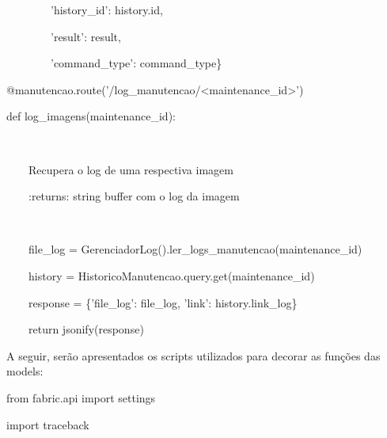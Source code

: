 {\ttfamily\color[rgb]{0.10980392,0.10980392,0.10980392}
    \ \ \ \ \ \ \ \ {}'history\_id': history.id,}

{\ttfamily\color[rgb]{0.10980392,0.10980392,0.10980392}
    \ \ \ \ \ \ \ \ {}'result': result,}

{\ttfamily\color[rgb]{0.10980392,0.10980392,0.10980392}
    \ \ \ \ \ \ \ \ {}'command\_type': command\_type\}}


    \bigskip


    \bigskip

{\ttfamily\color[rgb]{0.10980392,0.10980392,0.10980392}
    @manutencao.route('/log\_manutencao/{\textless}maintenance\_id{\textgreater}')}

{\ttfamily\color[rgb]{0.10980392,0.10980392,0.10980392}
    def log\_imagens(maintenance\_id):}

{\ttfamily\color[rgb]{0.10980392,0.10980392,0.10980392}
    \ \ \ \ {\textquotedbl}{\textquotedbl}{\textquotedbl}}

{\ttfamily\color[rgb]{0.10980392,0.10980392,0.10980392}
    \ \ \ \ Recupera o log de uma respectiva imagem}


    \bigskip

{\ttfamily\color[rgb]{0.10980392,0.10980392,0.10980392}
    \ \ \ \ :returns: string buffer com o log da imagem}

{\ttfamily\color[rgb]{0.10980392,0.10980392,0.10980392}
    \ \ \ \ {\textquotedbl}{\textquotedbl}{\textquotedbl}}

{\ttfamily\color[rgb]{0.10980392,0.10980392,0.10980392}
    \ \ \ \ file\_log = GerenciadorLog().ler\_logs\_manutencao(maintenance\_id)}

{\ttfamily\color[rgb]{0.10980392,0.10980392,0.10980392}
    \ \ \ \ history = HistoricoManutencao.query.get(maintenance\_id)}


    \bigskip

{\ttfamily\color[rgb]{0.10980392,0.10980392,0.10980392}
    \ \ \ \ response = \{'file\_log': file\_log, 'link': history.link\_log\}}

{\ttfamily\color[rgb]{0.10980392,0.10980392,0.10980392}
    \ \ \ \ return jsonify(response)}


    \bigskip

{\color{black}
    A seguir, ser\~ao apresentados os scripts utilizados para decorar as fun\c{c}\~oes das models:}

{\ttfamily\color[rgb]{0.10980392,0.10980392,0.10980392}
    from fabric.api import settings}

{\ttfamily\color[rgb]{0.10980392,0.10980392,0.10980392}
    import traceback}


